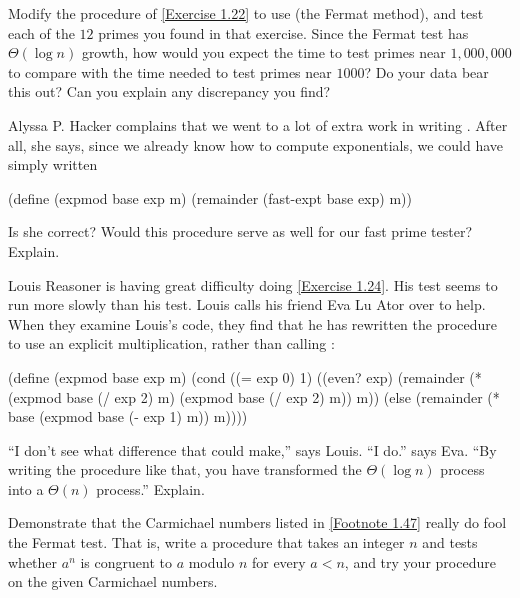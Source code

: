\begin{exercise}
	\label{Exercise 1.24}
	Modify the  procedure of \cref{Exercise 1.22} to use  (the Fermat method), and test each of the \( 12 \) primes you found in that exercise.
	Since the Fermat test has \( Θ(\log n) \) growth, how would you expect the time to test primes near \( 1,000,000 \) to compare with the time needed to test primes near \( 1000 \)?
	Do your data bear this out?
	Can you explain any discrepancy you find?
\end{exercise}



\begin{exercise}
	\label{Exercise 1.25}
	Alyssa P. Hacker complains that we went to a lot of extra work in writing .
	After all, she says, since we already know how to compute exponentials, we could have simply written
	\begin{scheme}
	  (define (expmod base exp m)
	    (remainder (fast-expt base exp) m))
	\end{scheme}
	Is she correct?
	Would this procedure serve as well for our fast prime tester?
	Explain.
\end{exercise}



\begin{exercise}
	\label{Exercise 1.26}
	Louis Reasoner is having great difficulty doing \cref{Exercise 1.24}.
	His  test seems to run more slowly than his  test.
	Louis calls his friend Eva Lu Ator over to help.
	When they examine Louis’s code, they find that he has rewritten the  procedure to use an explicit multiplication, rather than calling :
	\begin{scheme}
	  (define (expmod base exp m)
	    (cond ((= exp 0) 1)
	          ((even? exp)
	           (remainder (* (expmod base (/ exp 2) m)
	                         (expmod base (/ exp 2) m))
	                      m))
	          (else
	           (remainder (* base
	                         (expmod base (- exp 1) m))
	                      m))))
	\end{scheme}
	“I don’t see what difference that could make,” says Louis.
	“I do.” says Eva.
	“By writing the procedure like that, you have transformed the \( Θ(\log n) \) process into a \( Θ(n) \) process.”
	Explain.
\end{exercise}



\begin{exercise}
	\label{Exercise 1.27}
	Demonstrate that the Carmichael numbers listed in \cref{Footnote 1.47} really do fool the Fermat test.
	That is, write a procedure that takes an integer \( n \) and tests whether \( a^n \) is congruent to \( a \) modulo \( n \) for every \( a < n \), and try your procedure on the given Carmichael numbers.
\end{exercise}




